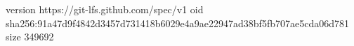 version https://git-lfs.github.com/spec/v1
oid sha256:91a47d9f4842d3457d731418b6029e4a9ae22947ad38bf5fb707ae5cda06d781
size 349692
